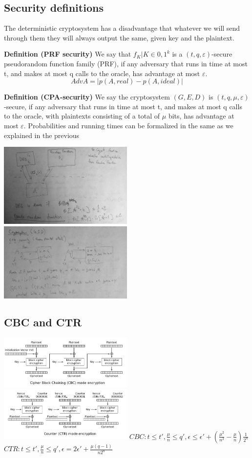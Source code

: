 \documentclass[a4paper,10pt]{article}
\begin{document}
\subsection*{Security definitions}
The deterministic cryptosystem has a disadvantage that whatever we will send through them they will always output the same, given key and the plaintext.

\noindent
\textbf{Definition (PRF security)} We say that ${f_K| K \in {0,1}^k}$ is a $(t,q,\varepsilon)$-secure pseudorandom function family (PRF), if any adversary that runs in time at most t, and makes at most q calls to the oracle, has advantage at most $\varepsilon$.
$$
AdvA= |p(A,real) − p(A,ideal)|
$$

\noindent
\textbf{Definition (CPA-security)} We say the cryptosystem $(G,E,D)$
is $(t,q,\mu,\varepsilon)$-secure, if any adversary that runs in time at most t, and makes at most q calls to the
oracle, with plaintexts consisting of a total of $\mu$ bits, has advantage at most $\varepsilon$.
Probabilities and running times can be formalized in the same as we explained in the previous




\includegraphics[width=0.5\textwidth]{PRF_security.jpg}
\includegraphics[width=0.5\textwidth]{CPA_security.jpg}
\subsection*{CBC and CTR}
\includegraphics[width=0.5\textwidth]{CBC.png}
\includegraphics[width=0.5\textwidth]{CTR.png}
$
CBC:
t \leq t', \frac{\mu}{n} \leq q', \epsilon \leq \epsilon' + \left( \frac{\mu^2}{n^2}-\frac{\mu}{n}\right) \frac{1}{2^n}
$\\
$
CTR:
t \leq t', \frac{\mu}{n} \leq q', \epsilon = 2\epsilon' + \frac{\mu(q-1)}{n2^n}
$
\end{document}
